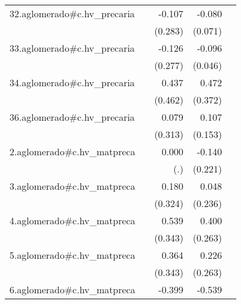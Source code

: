 {\begin{longtable}{l*{4}{D{.}{.}{-1}}}
\addlinespace
32.aglomerado#c.hv\_precaria&                     &      -0.107         &      -0.080         &                     \\
            &                     &     (0.283)         &     (0.071)         &                     \\
\addlinespace
33.aglomerado#c.hv\_precaria&                     &      -0.126         &      -0.096\sym{*}  &                     \\
            &                     &     (0.277)         &     (0.046)         &                     \\
\addlinespace
34.aglomerado#c.hv\_precaria&                     &       0.437         &       0.472         &                     \\
            &                     &     (0.462)         &     (0.372)         &                     \\
\addlinespace
36.aglomerado#c.hv\_precaria&                     &       0.079         &       0.107         &                     \\
            &                     &     (0.313)         &     (0.153)         &                     \\
\addlinespace
2.aglomerado#c.hv\_matpreca&                     &       0.000         &      -0.140         &                     \\
            &                     &         (.)         &     (0.221)         &                     \\
\addlinespace
3.aglomerado#c.hv\_matpreca&                     &       0.180         &       0.048         &                     \\
            &                     &     (0.324)         &     (0.236)         &                     \\
\addlinespace
4.aglomerado#c.hv\_matpreca&                     &       0.539         &       0.400         &                     \\
            &                     &     (0.343)         &     (0.263)         &                     \\
\addlinespace
5.aglomerado#c.hv\_matpreca&                     &       0.364         &       0.226         &                     \\
            &                     &     (0.343)         &     (0.263)         &                     \\
\addlinespace
6.aglomerado#c.hv\_matpreca&                     &      -0.399         &      -0.539\sym{**} &                     \\

\end{longtable}}
